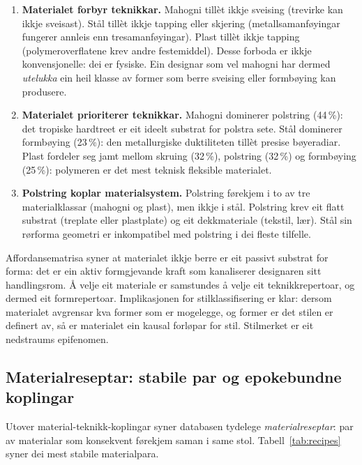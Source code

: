 \documentclass[10pt, a4paper, twocolumn]{article}
\begin{document}
\begin{enumerate}
  \item \textbf{Materialet forbyr teknikkar.} Mahogni tillèt ikkje sveising (trevirke kan ikkje sveisast). Stål tillèt ikkje tapping eller skjering (metallsamanføyingar fungerer annleis enn tresamanføyingar). Plast tillèt ikkje tapping (polymeroverflatene krev andre festemiddel). Desse forboda er ikkje konvensjonelle: dei er fysiske. Ein designar som vel mahogni har dermed \emph{utelukka} ein heil klasse av former som berre sveising eller formbøying kan produsere.

  \item \textbf{Materialet prioriterer teknikkar.} Mahogni dominerer polstring (44\,\%): det tropiske hardtreet er eit ideelt substrat for polstra sete. Stål dominerer formbøying (23\,\%): den metallurgiske duktiliteten tillèt presise bøyeradiar. Plast fordeler seg jamt mellom skruing (32\,\%), polstring (32\,\%) og formbøying (25\,\%): polymeren er det mest teknisk fleksible materialet.

  \item \textbf{Polstring koplar materialsystem.} Polstring førekjem i to av tre materialklassar (mahogni og plast), men ikkje i stål. Polstring krev eit flatt substrat (treplate eller plastplate) og eit dekkmateriale (tekstil, lær). Stål sin rørforma geometri er inkompatibel med polstring i dei fleste tilfelle.
\end{enumerate}

Affordansematrisa syner at materialet ikkje berre er eit passivt substrat for forma: det er ein aktiv formgjevande kraft som kanaliserer designaren sitt handlingsrom. Å velje eit materiale er samstundes å velje eit teknikkrepertoar, og dermed eit formrepertoar. Implikasjonen for stilklassifisering er klar: dersom materialet avgrensar kva former som er mogelegge, og former er det stilen er definert av, så er materialet ein kausal forløpar for stil. Stilmerket er eit nedstraums epifenomen.


\subsection{Materialreseptar: stabile par og epokebundne koplingar}

Utover material-teknikk-koplingar syner databasen tydelege \emph{materialreseptar}: par av materialar som konsekvent førekjem saman i same stol. Tabell~\ref{tab:recipes} syner dei mest stabile materialpara.
\end{document}
